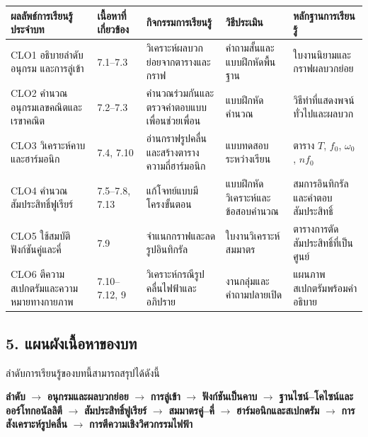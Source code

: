 \begin{table}[htbp]
    \centering
    \small
    \begin{tabularx}{\textwidth}{L{0.18\textwidth} L{0.12\textwidth} Y L{0.17\textwidth} Y}
        \hline
        \textbf{ผลลัพธ์การเรียนรู้ประจำบท} & \textbf{เนื้อหาที่เกี่ยวข้อง} & \textbf{กิจกรรมการเรียนรู้} & \textbf{วิธีประเมิน} & \textbf{หลักฐานการเรียนรู้} \\
        \hline
        CLO1 อธิบายลำดับ อนุกรม และการลู่เข้า & 7.1--7.3 & วิเคราะห์ผลบวกย่อยจากตารางและกราฟ & คำถามสั้นและแบบฝึกหัดพื้นฐาน & ใบงานนิยามและกราฟผลบวกย่อย \\
        CLO2 คำนวณอนุกรมเลขคณิตและเรขาคณิต & 7.2--7.3 & คำนวณร่วมกันและตรวจคำตอบแบบเพื่อนช่วยเพื่อน & แบบฝึกหัดคำนวณ & วิธีทำที่แสดงพจน์ทั่วไปและผลบวก \\
        CLO3 วิเคราะห์คาบและฮาร์มอนิก & 7.4, 7.10 & อ่านกราฟรูปคลื่นและสร้างตารางความถี่ฮาร์มอนิก & แบบทดสอบระหว่างเรียน & ตาราง \(T\), \(f_0\), \(\omega_0\), \(nf_0\) \\
        CLO4 คำนวณสัมประสิทธิ์ฟูเรียร์ & 7.5--7.8, 7.13 & แก้โจทย์แบบมีโครงขั้นตอน & แบบฝึกหัดวิเคราะห์และข้อสอบคำนวณ & สมการอินทิกรัลและคำตอบสัมประสิทธิ์ \\
        CLO5 ใช้สมบัติฟังก์ชันคู่และคี่ & 7.9 & จำแนกกราฟและลดรูปอินทิกรัล & ใบงานวิเคราะห์สมมาตร & ตารางการตัดสัมประสิทธิ์ที่เป็นศูนย์ \\
        CLO6 ตีความสเปกตรัมและความหมายทางกายภาพ & 7.10--7.12, 9 & วิเคราะห์กรณีรูปคลื่นไฟฟ้าและอภิปราย & งานกลุ่มและคำถามปลายเปิด & แผนภาพสเปกตรัมพร้อมคำอธิบาย \\
        \hline
    \end{tabularx}
\end{table}


\subsection{5. แผนผังเนื้อหาของบท}

ลำดับการเรียนรู้ของบทนี้สามารถสรุปได้ดังนี้

\textbf{ลำดับ} \(\rightarrow\) \textbf{อนุกรมและผลบวกย่อย} \(\rightarrow\) \textbf{การลู่เข้า} \(\rightarrow\) \textbf{ฟังก์ชันเป็นคาบ} \(\rightarrow\) \textbf{ฐานไซน์--โคไซน์และออร์โทกอนัลลิตี} \(\rightarrow\) \textbf{สัมประสิทธิ์ฟูเรียร์} \(\rightarrow\) \textbf{สมมาตรคู่--คี่} \(\rightarrow\) \textbf{ฮาร์มอนิกและสเปกตรัม} \(\rightarrow\) \textbf{การสังเคราะห์รูปคลื่น} \(\rightarrow\) \textbf{การตีความเชิงวิศวกรรมไฟฟ้า}

